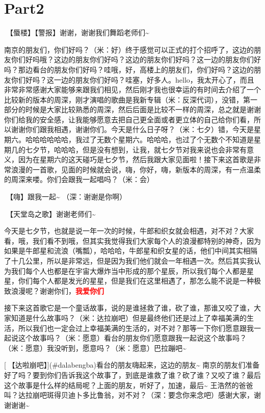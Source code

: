 \documentclass[
]{book}
\begin{document}
\section{Part2}\label{nanjing-20240810-part2}

🎵【蜃楼】【警报】谢谢，谢谢我们舞蹈老师们\textasciitilde{}

南京的朋友们，你们好吗？（米：好）终于感觉可以正式的打个招呼了，这边的朋友你们好吗哦？这边的朋友你们好吗？这边的朋友你们好吗？这一边的朋友你们好吗？那边看台的朋友你们好吗？哇哦，好，高楼上的朋友们，你们好吗？这边的朋友你们好吗？这一边的朋友你们好吗？哇塞，好多人。hello，我太开心了，而且非常非常感谢大家能够来跟我们相见，然后刚才我也很幸运的有时间去介绍了一个比较新的版本的周深，刚才演唱的歌曲是我新专辑（米：反深代词），没错，第一部分的时候是大家比较熟悉的周深，然后后面是比较不一样的周深，总之就是谢谢你们给我的安全感，让我能够愿意去把自己更全面或者更立体的自己给你们看，所以谢谢你们跟我相遇，谢谢你们。今天是什么日子呀？（米：七夕）错，今天是星期六。哈哈哈哈哈哈，我过了无数个星期六。哈哈哈，也过了个无数个不知道是星期几的七夕节，哈哈哈，但是没有想到，让我，就七夕节对我来说也会非常有意义，因为在星期六的这天碰巧是七夕节，然后我跟大家见面啦！接下来这首歌是非常浪漫的一首歌，见面的时候就会说，嗨，你好，嗨，新版本的周深，有一点温柔的周深来喽。你们会跟我一起唱吗？（米：会）

🎵【嗨】跟我一起\textasciitilde{} （深：谢谢是你啊）

🎵【天堂岛之歌】谢谢老师们\textasciitilde{}

今天是七夕节，也就是说一年一次的时候，牛郎和织女就会相遇，对不对？大家看，哦，我们看不到哦，但其实我觉得我们大家每个人的浪漫都特别的神奇，因为如果是牛郎星和流浪（嘴瓢），哈哈哈，牛郎星和织女星的话，他们中间其实相隔了十几公里，所以是非常远，但是因为我们他们就会一年相遇一次。然后其实我认为我们每个人也都是在宇宙大爆炸当中形成的那个星辰，所以我们每个人都是星星，你们每个人都是发光的星星，但是我们在这里相遇了，那怎么能不说是一种极致浪漫呢？谢谢你们，\textbf{\textcolor{red}{我爱你们~} }

接下来这首歌它是一个童话故事，说的是谁拯救了谁，砍了谁，那谁又咬了谁，大家知道是什么故事吗？（米：达拉崩吧）但是最终他们还是过上了幸福美满的生活，所以我们也一定会过上幸福美满的生活的，对不对？那等一下你们愿意跟我一起说这个故事吗？（米：愿意）看台的朋友你们愿意跟我一起说这个故事吗？（米：愿意）我没听到，愿意吗？（米：愿意）巴拉蹦吧\textasciitilde{}

[🎵【达啦崩吧】](#dalabengba)看台的朋友嗨起来，这边的朋友\textasciitilde{} 南京的朋友们准备好了吗？要到你们告诉我这个故事了，到底是谁救了谁？砍了谁？又咬了谁？最后这个故事是什么样的结局呢？上面的朋友，听好了，加速，最后\textasciitilde{} 王浩然的爸爸叫？达拉崩吧斑得贝迪卜多比鲁翁，对不对？（深：要念你来念吧）感谢大家，谢谢谢谢\textasciitilde{}
\end{document}
